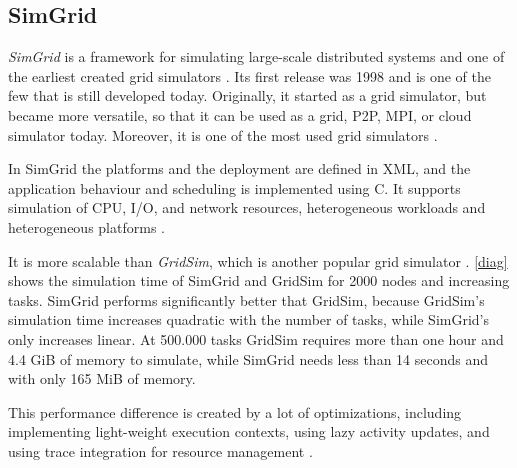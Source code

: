 \subsection{SimGrid}
\label{simgrid}
\textit{SimGrid} is a framework for simulating large-scale distributed systems and one of the earliest created grid simulators \cite{simgrid_update}. Its first release was 1998 and is one of the few that is still developed today. Originally, it started as a grid simulator, but became more versatile, so that it can be used as a grid, P2P, MPI, or cloud simulator today. Moreover, it is one of the most used grid simulators \cite{simgrid_update}.

In SimGrid the platforms and the deployment are defined in XML, and the application behaviour and scheduling is implemented using C. It supports simulation of CPU, I/O, and network resources, heterogeneous workloads and heterogeneous platforms \cite{simgrid_update}.

It is more scalable than \textit{GridSim}, which is another popular grid simulator \cite{simgrid_update}.
\ref{diag} shows the simulation time of SimGrid and GridSim for 2000 nodes and increasing tasks.
SimGrid performs significantly better that GridSim, because GridSim's simulation time increases quadratic with the number of tasks, while SimGrid's only increases linear. At 500.000 tasks GridSim requires more than one hour and 4.4 GiB of memory to simulate, while SimGrid needs less than 14 seconds and with only 165 MiB of memory.

This performance difference is created by a lot of optimizations, including implementing light-weight execution contexts, using lazy activity updates, and using trace integration for resource management \cite{simgrid_update}.

\begin{center}

\end{center}


